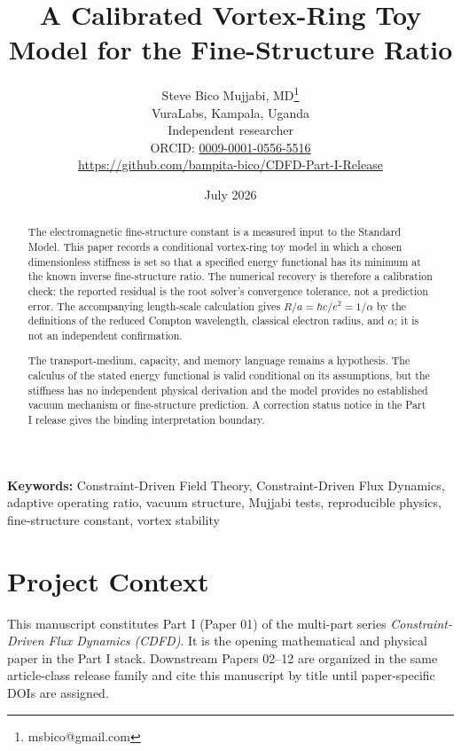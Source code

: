 \documentclass[11pt]{article}
\begin{document}
\title{A Calibrated Vortex-Ring Toy Model for the Fine-Structure Ratio}

\author{Steve Bico Mujjabi, MD\thanks{msbico@gmail.com}\\
VuraLabs, Kampala, Uganda\\
Independent researcher\\
ORCID: \href{https://orcid.org/0009-0001-0556-5516}{0009-0001-0556-5516}\\
\url{https://github.com/bampita-bico/CDFD-Part-I-Release}}

\date{July 2026}

\maketitle

\begin{abstract}
The electromagnetic fine-structure constant is a measured input to the Standard
Model. This paper records a conditional vortex-ring toy model in which a chosen
dimensionless stiffness is set so that a specified energy functional has its
minimum at the known inverse fine-structure ratio. The numerical recovery is
therefore a calibration check: the reported residual is the root solver's
convergence tolerance, not a prediction error. The accompanying length-scale
calculation gives $R/a=\hbar c/e^2=1/\alpha$ by the definitions of the reduced
Compton wavelength, classical electron radius, and $\alpha$; it is not an
independent confirmation.

The transport-medium, capacity, and memory language remains a hypothesis. The
calculus of the stated energy functional is valid conditional on its assumptions,
but the stiffness has no independent physical derivation and the model provides
no established vacuum mechanism or fine-structure prediction. A correction
status notice in the Part I release gives the binding interpretation boundary.
\end{abstract}

\noindent\textbf{Keywords:} Constraint-Driven Field Theory, Constraint-Driven Flux Dynamics, adaptive operating ratio, vacuum structure, Mujjabi tests, reproducible physics, fine-structure constant, vortex stability

\vspace{0.75em}
\linenumbers

\section*{Project Context}
This manuscript constitutes Part I (Paper 01) of the multi-part series
\textit{Constraint-Driven Flux Dynamics (CDFD)}. It is the opening mathematical
and physical paper in the Part I stack. Downstream Papers 02--12 are organized in the same article-class release family and cite this manuscript by title until paper-specific DOIs are assigned.
\end{document}
